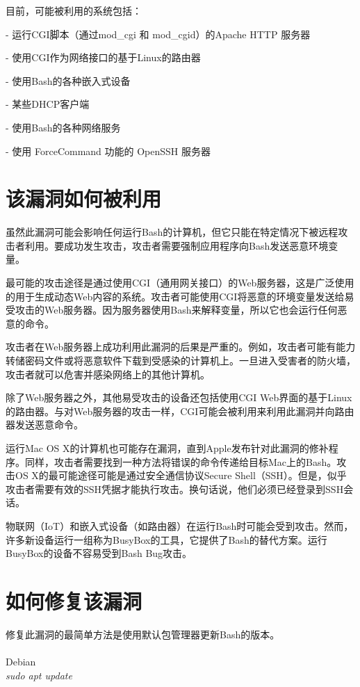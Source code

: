 \documentclass[11pt,journal,compsoc]{IEEEtran}
\begin{document}
\begin{CJK}{UTF8}{gkai}
目前，可能被利用的系统包括：

- 运行CGI脚本（通过mod\_cgi 和 mod\_cgid）的Apache HTTP 服务器

- 使用CGI作为网络接口的基于Linux的路由器

- 使用Bash的各种嵌入式设备

- 某些DHCP客户端

- 使用Bash的各种网络服务

- 使用 ForceCommand 功能的 OpenSSH 服务器


\section{该漏洞如何被利用}
虽然此漏洞可能会影响任何运行Bash的计算机，但它只能在特定情况下被远程攻击者利用。要成功发生攻击，攻击者需要强制应用程序向Bash发送恶意环境变量。

最可能的攻击途径是通过使用CGI（通用网关接口）的Web服务器，这是广泛使用的用于生成动态Web内容的系统。攻击者可能使用CGI将恶意的环境变量发送给易受攻击的Web服务器。因为服务器使用Bash来解释变量，所以它也会运行任何恶意的命令。

攻击者在Web服务器上成功利用此漏洞的后果是严重的。例如，攻击者可能有能力转储密码文件或将恶意软件下载到受感染的计算机上。一旦进入受害者的防火墙，攻击者就可以危害并感染网络上的其他计算机。

除了Web服务器之外，其他易受攻击的设备还包括使用CGI Web界面的基于Linux的路由器。与对Web服务器的攻击一样，CGI可能会被利用来利用此漏洞并向路由器发送恶意命令。

运行Mac OS X的计算机也可能存在漏洞，直到Apple发布针对此漏洞的修补程序。同样，攻击者需要找到一种方法将错误的命令传递给目标Mac上的Bash。攻击OS X的最可能途径可能是通过安全通信协议Secure Shell（SSH）。但是，似乎攻击者需要有效的SSH凭据才能执行攻击。换句话说，他们必须已经登录到SSH会话。

物联网（IoT）和嵌入式设备（如路由器）在运行Bash时可能会受到攻击。然而，许多新设备运行一组称为BusyBox的工具，它提供了Bash的替代方案。运行BusyBox的设备不容易受到Bash Bug攻击。\\

\section{如何修复该漏洞}
修复此漏洞的最简单方法是使用默认包管理器更新Bash的版本。\\\\
Debian\\

\emph{sudo apt update}\\


\end{CJK}
\end{document}
